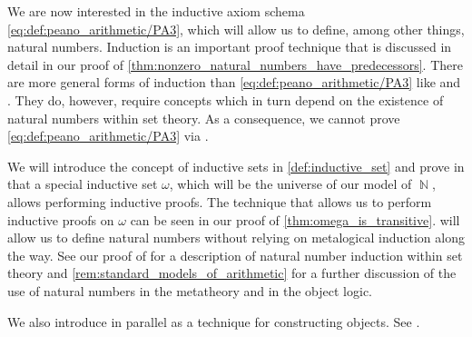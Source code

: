 \begin{remark}\label{rem:inductive_sets}
  We are now interested in the inductive axiom schema \eqref{eq:def:peano_arithmetic/PA3}, which will allow us to define, among other things, natural numbers. Induction is an important proof technique that is discussed in detail in our proof of \cref{thm:nonzero_natural_numbers_have_predecessors}. There are more general forms of induction than \eqref{eq:def:peano_arithmetic/PA3} like  and . They do, however, require concepts which in turn depend on the existence of natural numbers within set theory. As a consequence, we cannot prove \eqref{eq:def:peano_arithmetic/PA3} via .

  We will introduce the concept of inductive sets in \cref{def:inductive_set} and prove in  that a special inductive set \hyperref[thm:smallest_inductive_set_existence]{\( \omega \)}, which will be the universe of our model of \( \BbbN \), allows performing inductive proofs. The technique that allows us to perform inductive proofs on \( \omega \) can be seen in our proof of \cref{thm:omega_is_transitive}.  will allow us to define natural numbers without relying on metalogical induction along the way. See our proof of  for a description of natural number induction within set theory and \cref{rem:standard_models_of_arithmetic} for a further discussion of the use of natural numbers in the metatheory and in the object logic.

  We also introduce  in parallel as a technique for constructing objects. See .
\end{remark}

